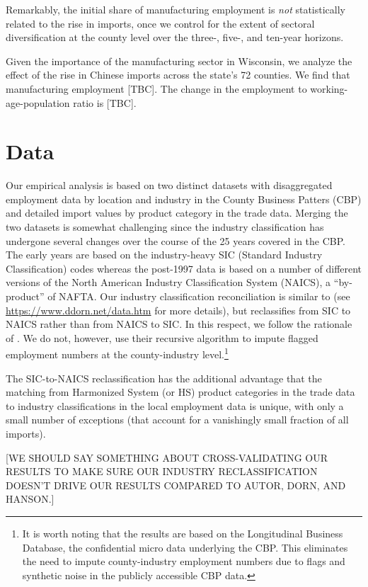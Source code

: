 \documentclass[onehalfspacing,11pt]{article}
\begin{document}
Remarkably, the initial share of manufacturing employment is {\it not} statistically related to the rise in imports, once we control for the extent of sectoral diversification at the county level over the three-, five-, and ten-year horizons.

Given the importance of the manufacturing sector in Wisconsin, we analyze the effect of the rise in Chinese imports across the state's 72 counties. We find that manufacturing employment [TBC]. The change in the employment to working-age-population ratio is [TBC]. 

\section{Data}
Our empirical analysis is based on two distinct datasets with disaggregated employment data by location and industry in the County Business Patters (CBP) and detailed import values by product category in the trade data. Merging the two datasets is somewhat challenging since the industry classification has undergone several changes over the course of the 25 years covered in the CBP. The early years are based on the industry-heavy SIC (Standard Industry Classification) codes whereas the post-1997 data is based on a number of different versions of the North American Industry Classification System (NAICS), a ``by-product'' of NAFTA. Our industry classification reconciliation is similar to \cite{Autor:2013} (see \href{https://www.ddorn.net/data.htm}{https://www.ddorn.net/data.htm} for more details), but reclassifies from SIC to NAICS rather than from NAICS to SIC. In this respect, we follow the rationale of \cite{Eckert:2020}. We do not, however, use their recursive algorithm to impute flagged employment numbers at the county-industry level.\footnote{It is worth noting that the \cite{Bloom:2019} results are based on the Longitudinal Business Database, the confidential micro data underlying the CBP. This eliminates the need to impute county-industry employment numbers due to flags and synthetic noise in the publicly accessible CBP data.}

The SIC-to-NAICS reclassification has the additional advantage that the matching from Harmonized System (or HS) product categories in the trade data to industry classifications in the local employment data is unique, with only a small number of exceptions (that account for a vanishingly small fraction of all imports).

[WE SHOULD SAY SOMETHING ABOUT CROSS-VALIDATING OUR RESULTS TO MAKE SURE OUR INDUSTRY RECLASSIFICATION DOESN'T DRIVE OUR RESULTS COMPARED TO AUTOR, DORN, AND HANSON.]
\newpage


\end{document}
